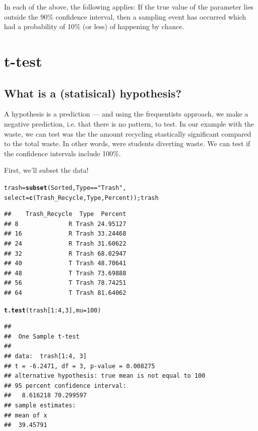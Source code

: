 \documentclass{tufte-handout}\usepackage[]{graphicx}\usepackage[]{color}
\makeatletter
\newcommand{\hlnum}[1]{\textcolor[rgb]{0.686,0.059,0.569}{#1}}%
\newcommand{\hlstr}[1]{\textcolor[rgb]{0.192,0.494,0.8}{#1}}%
\newcommand{\hlopt}[1]{\textcolor[rgb]{0,0,0}{#1}}%
\newcommand{\hlstd}[1]{\textcolor[rgb]{0.345,0.345,0.345}{#1}}%
\newcommand{\hlkwb}[1]{\textcolor[rgb]{0.69,0.353,0.396}{#1}}%
\newcommand{\hlkwc}[1]{\textcolor[rgb]{0.333,0.667,0.333}{#1}}%
\newcommand{\hlkwd}[1]{\textcolor[rgb]{0.737,0.353,0.396}{\textbf{#1}}}%
\newenvironment{kframe}{%
 \def\at@end@of@kframe{}%
 \ifinner\ifhmode%
  \def\at@end@of@kframe{\end{minipage}}%
  \begin{minipage}{\columnwidth}%
 \fi\fi%
 \def\FrameCommand##1{\hskip\@totalleftmargin \hskip-\fboxsep
 \colorbox{shadecolor}{##1}\hskip-\fboxsep
     \hskip-\linewidth \hskip-\@totalleftmargin \hskip\columnwidth}%
 \MakeFramed {\advance\hsize-\width
   \@totalleftmargin\z@ \linewidth\hsize
   \@setminipage}}%
 {\par\unskip\endMakeFramed%
 \at@end@of@kframe}
\newenvironment{knitrout}{}{} %
\makeatother
\begin{document}
In each of the above, the following applies: If the true value of the parameter lies outside the 90\% confidence interval, then a sampling event has occurred which had a probability of 10\% (or less) of happening by chance.



\clearpage
\section{t-test}

\subsection{What is a (statisical) hypothesis?}

A hypothesis is a prediction --- and using the frequentists approach, we make a negative prediction, i.e. that there is no pattern, to test. In our example with the waste, we can test was the the amount recycling stastically significant compared to the total waste. In other words, were students diverting waste. We can test if the confidence intervals include 100\%. 

First, we'll subset the data!
\begin{knitrout}
\color{fgcolor}\begin{kframe}
\begin{alltt}
\hlstd{trash} \hlkwb{=} \hlkwd{subset}\hlstd{(Sorted, Type} \hlopt{==} \hlstr{"Trash"}\hlstd{,}
        \hlkwc{select} \hlstd{=} \hlkwd{c}\hlstd{(Trash_Recycle, Type, Percent)); trash}
\end{alltt}
\begin{verbatim}
##    Trash_Recycle  Type  Percent
## 8              R Trash 24.95127
## 16             R Trash 33.24468
## 24             R Trash 31.60622
## 32             R Trash 68.02947
## 40             T Trash 48.70641
## 48             T Trash 73.69888
## 56             T Trash 78.74251
## 64             T Trash 81.64062
\end{verbatim}
\end{kframe}
\end{knitrout}

\begin{knitrout}
\color{fgcolor}\begin{kframe}
\begin{alltt}
\hlkwd{t.test}\hlstd{(trash[}\hlnum{1}\hlopt{:}\hlnum{4}\hlstd{,}\hlnum{3}\hlstd{],} \hlkwc{mu}\hlstd{=}\hlnum{100}\hlstd{)}
\end{alltt}
\begin{verbatim}
## 
## 	One Sample t-test
## 
## data:  trash[1:4, 3]
## t = -6.2471, df = 3, p-value = 0.008275
## alternative hypothesis: true mean is not equal to 100
## 95 percent confidence interval:
##   8.616218 70.299597
## sample estimates:
## mean of x 
##  39.45791
\end{verbatim}
\end{kframe}
\end{knitrout}
\end{document}
